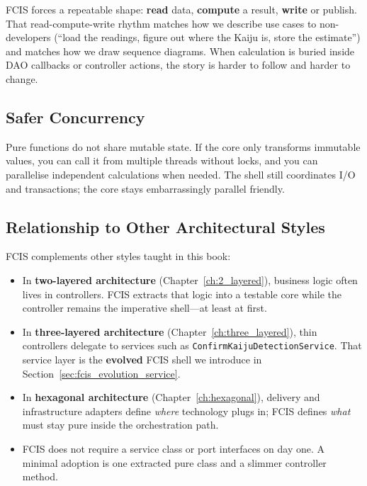 FCIS forces a repeatable shape: \textbf{read} data, \textbf{compute} a result, \textbf{write} or publish. That read-compute-write rhythm matches how we describe use cases to non-developers (``load the readings, figure out where the Kaiju is, store the estimate'') and matches how we draw sequence diagrams. When calculation is buried inside DAO callbacks or controller actions, the story is harder to follow and harder to change.

\subsection{Safer Concurrency}
\label{sec:fcis_why_concurrency}

Pure functions do not share mutable state. If the core only transforms immutable values, you can call it from multiple threads without locks, and you can parallelise independent calculations when needed. The shell still coordinates I/O and transactions; the core stays embarrassingly parallel friendly.

\subsection{Relationship to Other Architectural Styles}
\label{sec:fcis_why_other_styles}

FCIS complements other styles taught in this book:
\begin{itemize}
    \item In \textbf{two-layered architecture} (Chapter~\ref{ch:2_layered}), business logic often lives in controllers. FCIS extracts that logic into a testable core while the controller remains the imperative shell---at least at first.
    \item In \textbf{three-layered architecture} (Chapter~\ref{ch:three_layered}), thin controllers delegate to services such as \texttt{ConfirmKaijuDetectionService}. That service layer is the \textbf{evolved} FCIS shell we introduce in Section~\ref{sec:fcis_evolution_service}.
    \item In \textbf{hexagonal architecture} (Chapter~\ref{ch:hexagonal}), delivery and infrastructure adapters define \textit{where} technology plugs in; FCIS defines \textit{what} must stay pure inside the orchestration path.
    \item FCIS does not require a service class or port interfaces on day one. A minimal adoption is one extracted pure class and a slimmer controller method.
\end{itemize}

